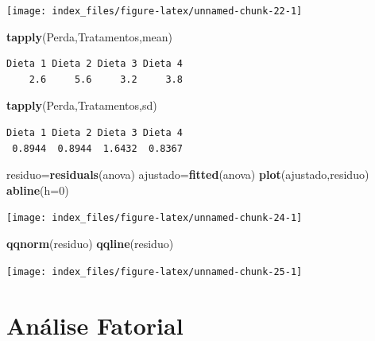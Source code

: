 \documentclass[12pt,brazil,oneside]{book}
\newenvironment{Shaded}{\begin{snugshade}}{\end{snugshade}}
\newcommand{\DataTypeTok}[1]{\textcolor[rgb]{0.13,0.29,0.53}{#1}}
\newcommand{\DecValTok}[1]{\textcolor[rgb]{0.00,0.00,0.81}{#1}}
\newcommand{\KeywordTok}[1]{\textcolor[rgb]{0.13,0.29,0.53}{\textbf{#1}}}
\newcommand{\NormalTok}[1]{#1}
\begin{document}
\begin{center}\texttt{[image: index\_files/figure-latex/unnamed-chunk-22-1]} \end{center}

\begin{Shaded}
\begin{Highlighting}[]
\KeywordTok{tapply}\NormalTok{(Perda,Tratamentos,mean)}
\end{Highlighting}
\end{Shaded}

\begin{verbatim}
Dieta 1 Dieta 2 Dieta 3 Dieta 4 
    2.6     5.6     3.2     3.8 
\end{verbatim}

\begin{Shaded}
\begin{Highlighting}[]
\KeywordTok{tapply}\NormalTok{(Perda,Tratamentos,sd)}
\end{Highlighting}
\end{Shaded}

\begin{verbatim}
Dieta 1 Dieta 2 Dieta 3 Dieta 4 
 0.8944  0.8944  1.6432  0.8367 
\end{verbatim}

\begin{Shaded}
\begin{Highlighting}[]
\NormalTok{residuo=}\KeywordTok{residuals}\NormalTok{(anova)}
\NormalTok{ajustado=}\KeywordTok{fitted}\NormalTok{(anova)}
\KeywordTok{plot}\NormalTok{(ajustado,residuo)}
\KeywordTok{abline}\NormalTok{(}\DataTypeTok{h=}\DecValTok{0}\NormalTok{)}
\end{Highlighting}
\end{Shaded}

\begin{center}\texttt{[image: index\_files/figure-latex/unnamed-chunk-24-1]} \end{center}

\begin{Shaded}
\begin{Highlighting}[]
\KeywordTok{qqnorm}\NormalTok{(residuo)}
\KeywordTok{qqline}\NormalTok{(residuo)}
\end{Highlighting}
\end{Shaded}

\begin{center}\texttt{[image: index\_files/figure-latex/unnamed-chunk-25-1]} \end{center}

\hypertarget{analise-fatorial}{%
\chapter{Análise Fatorial}\label{analise-fatorial}}
\end{document}
